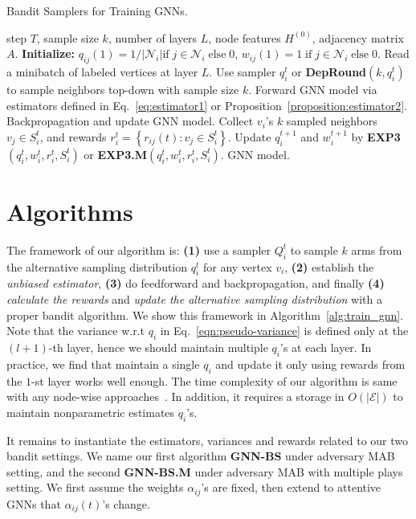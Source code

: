 \documentclass{article}
\begin{document}
\begin{algorithm}
\caption{Bandit Samplers for Training GNNs.}
\label{alg:train_gnn}
\begin{algorithmic}[1]
\Require step $T$, sample size $k$, number of layers $L$, node features $H^{(0)}$, adjacency matrix $A$.
\State \textbf{Initialize:} $q_{ij}(1)=
	1/\left|\mathcal{N}_i\right| \text{if}\; j\in\mathcal{N}_i \;
	\text{else}\;0
$, 
$w_{ij}(1)=
	1\; \text{if}\; j\in\mathcal{N}_i \;
	\text{else}\;0
$. 
\State Read a minibatch of labeled vertices at layer $L$.
\State Use sampler $q_{i}^t$ or \textbf{DepRound}$(k, q_i^t)$ to sample neighbors top-down with sample size $k$.
\State Forward GNN model via estimators defined in Eq.~\eqref{eq:estimator1} or Proposition~\ref{proposition:estimator2}.
\State Backpropagation and update GNN model.
\State Collect $v_i$'s $k$ sampled neighbors
$v_j \in S_i^t$, and rewards $r_i^t=\left\{r_{ij}(t): v_j \in S_i^t\right\}$. 
\State Update $q_i^{t+1}$ and $w_i^{t+1}$ by \textbf{EXP3}$(q_i^t,w_i^t,r_i^t,S_i^t)$ 
or \textbf{EXP3.M}$(q_i^t,w_i^t,r_i^t,S_i^t)$.
\EndFor
\EndFor
\State \Return GNN model.
\end{algorithmic}
\end{algorithm}

\section{Algorithms}
The framework of our algorithm is: \textbf{(1)} 
use a sampler $Q_i^t$ to sample $k$ arms from the 
alternative sampling distribution $q_i^t$ for any vertex $v_i$,
\textbf{(2)} establish the \emph{unbiased 
estimator}, \textbf{(3)} do feedforward and 
backpropagation, and finally \textbf{(4)}
\emph{calculate the rewards} and \emph{update the alternative
sampling distribution}
with a proper bandit algorithm. We show this framework
in Algorithm~\ref{alg:train_gnn}. Note that
the variance w.r.t $q_i$ in Eq.~\eqref{eqn:pseudo-variance} 
is defined only at the $(l+1)$-th layer, hence
we should maintain multiple $q_i$'s at each layer.
In practice, we find that maintain a single $q_i$ 
and update it only using rewards from the $1$-st 
layer works well enough. The time complexity of our algorithm
is same with any node-wise 
approaches~\cite{hamilton2017inductive}. In addition, it requires
a storage in $O(|\mathcal{E}|)$ to maintain nonparametric
estimates $q_i$'s.

It remains to instantiate the estimators, variances
and rewards related to our two bandit settings.
We name our first algorithm \textbf{GNN-BS} under
adversary MAB setting, and the second \textbf{GNN-BS.M}
under adversary MAB with multiple plays setting.
We first assume the weights $\alpha_{ij}$'s are fixed,
then extend to attentive GNNs that
$\alpha_{ij}(t)$'s change.
\end{document}

